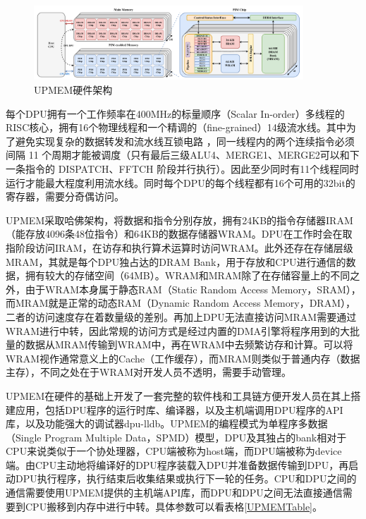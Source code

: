 \begin{figure}[!htbp]
	\centering
    \includegraphics[width=0.9\textwidth]{figures/UPMEMArch.pdf}
    \caption{UPMEM硬件架构}
	\label{UPMEMArch}
\end{figure}

每个DPU拥有一个工作频率在400MHz的标量顺序（Scalar In-order）多线程的RISC核心，拥有16个物理线程和一个精调的（fine-grained）14级流水线。其中为了避免实现复杂的数据转发和流水线互锁电路 \cite{UPMEMHotChips}，同一线程内的两个连续指令必须间隔 11 个周期才能被调度（只有最后三级ALU4、MERGE1、MERGE2可以和下一条指令的 DISPATCH、FFTCH 阶段并行执行）。因此至少同时有11个线程同时运行才能最大程度利用流水线。同时每个DPU的每个线程都有16个可用的32bit的寄存器，需要分奇偶访问。

UPMEM采取哈佛架构，将数据和指令分别存放，拥有24KB的指令存储器IRAM（能存放4096条48位指令）和64KB的数据存储器WRAM。DPU在工作时会在取指阶段访问IRAM，在访存和执行算术运算时访问WRAM。此外还存在存储层级MRAM，其就是每个DPU独占达的DRAM Bank，用于存放和CPU进行通信的数据，拥有较大的存储空间（64MB）。WRAM和MRAM除了在存储容量上的不同之外，由于WRAM本身属于静态RAM（Static Random Access Memory，SRAM），而MRAM就是正常的动态RAM（Dynamic Random Access Memory，DRAM），二者的访问速度存在着数量级的差别。再加上DPU无法直接访问MRAM需要通过WRAM进行中转，因此常规的访问方式是经过内置的DMA引擎将程序用到的大批量的数据从MRAM传输到WRAM中，再在WRAM中去频繁访存和计算。可以将WRAM视作通常意义上的Cache（工作缓存），而MRAM则类似于普通内存（数据主存），不同之处在于WRAM对开发人员不透明，需要手动管理。

UPMEM在硬件的基础上开发了一套完整的软件栈和工具链方便开发人员在其上搭建应用，包括DPU程序的运行时库、编译器，以及主机端调用DPU程序的API库，以及功能强大的调试器dpu-lldb。UPMEM的编程模式为单程序多数据（Single Program Multiple Data，SPMD）模型，DPU及其独占的bank相对于CPU来说类似于一个协处理器，CPU端被称为host端，而DPU端被称为device端。由CPU主动地将编译好的DPU程序装载入DPU并准备数据传输到DPU，再启动DPU执行程序，执行结束后收集结果或执行下一轮的任务。CPU和DPU之间的通信需要使用UPMEM提供的主机端API库，而DPU和DPU之间无法直接通信需要到CPU搬移到内存中进行中转。具体参数可以看表格\ref{UPMEMTable}。

